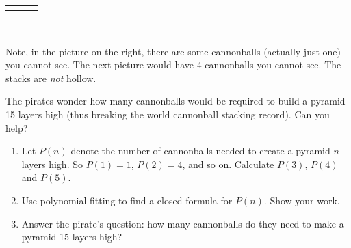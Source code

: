 \documentclass[10pt,]{book}
\theoremstyle{plain}
\theoremstyle{definition}
\theoremstyle{definition}
\theoremstyle{definition}
\theoremstyle{definition}
\numberwithin{equation}{chapter}
\newlength{\panelmax}
\begin{document}
\begin{exerciselist}
{\begin{lrbox}{\panelboxCimage}
{{}
}\end{lrbox}
\ifdefined\phCimage\else\newlength{\phCimage}\fi%
\setlength{\phCimage}{\ht\panelboxCimage+\dp\panelboxCimage}
\settototalheight{\phCimage}{\usebox{\panelboxCimage}}
\setlength{\panelmax}{\maxof{\panelmax}{\phCimage}}
\leavevmode%
\setlength{\tabcolsep}{0.08\linewidth}
\par\medskip\noindent
\hspace*{0.08\linewidth}%
\begin{tabular}{@{}*{3}{c}@{}}
\begin{minipage}[c][\panelmax][b]{0.08\linewidth}\usebox{\panelboxAimage}\end{minipage}&
\begin{minipage}[c][\panelmax][b]{0.18\linewidth}\usebox{\panelboxBimage}\end{minipage}&
\begin{minipage}[c][\panelmax][b]{0.26\linewidth}\usebox{\panelboxCimage}\end{minipage}\end{tabular}\\
}%
\par
\hypertarget{p-270}{}%
Note, in the picture on the right, there are some cannonballs (actually just one) you cannot see. The next picture would have 4 cannonballs you cannot see. The stacks are \emph{not} hollow.%
\par
\hypertarget{p-271}{}%
The pirates wonder how many cannonballs would be required to build a pyramid 15 layers high (thus breaking the world cannonball stacking record). Can you help?%
\par
\hypertarget{p-272}{}%
\leavevmode%
\begin{enumerate}[label=(\alph*)]
\item\hypertarget{li-174}{}\hypertarget{p-273}{}%
Let \(P(n)\) denote the number of cannonballs needed to create a pyramid \(n\) layers high. So \(P(1) = 1\), \(P(2) = 4\), and so on. Calculate \(P(3)\), \(P(4)\) and \(P(5)\). %
\item\hypertarget{li-175}{}\hypertarget{p-274}{}%
Use polynomial fitting to find a closed formula for \(P(n)\). Show your work. %
\item\hypertarget{li-176}{}\hypertarget{p-275}{}%
Answer the pirate's question: how many cannonballs do they need to make a pyramid 15 layers high? %

\end{enumerate}
\end{exerciselist}
\end{document}
